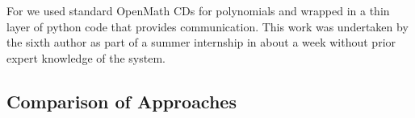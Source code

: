 For \Singular we used standard OpenMath CDs for polynomials and wrapped
\Singular in a thin layer of python code that provides \SCSCP
communication. This work was undertaken by the sixth author as part of a summer
internship in about a week without prior expert
knowledge of the system.

\subsection{Comparison of Approaches}


